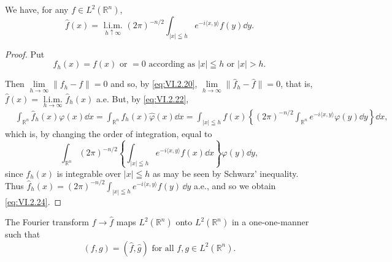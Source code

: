 \begin{corollary}\label{cor:VI.2.Corollary.1a} We have, for any $f \in L^2(\mathbb{R}^{n})$, 
\begin{equation}\label{eq:VI.2.24}
\hat {f} (x) = \underset {h \uparrow \infty} {\text{ l.i.m. }} (2 \pi) ^{-n/2} \int_{| x | \leqq h} e ^{- i \langle x, y \rangle} f (y) \dd y.
\end{equation}
\end{corollary}

\begin{proof}
 Put 
\[
f _{h} (x) = f (x) \text{ or } = 0 \text{ according as } | x | \leqq h \text{ or } | x | > h. \]

Then $\lim\limits_{h\to \infty}\|f_h - f\| = 0$ and so, by \eqref{eq:VI.2.20}, $\lim\limits_{h\to \infty}\|\hat{f}_h - \hat{f} \| = 0$, that is, $\hat{f}(x) = \underset {h\to \infty}{\text{ l.i.m. }}\hat{f}_h(x)$ a.e. But, by \eqref{eq:VI.2.22}, 
\[
\begin{aligned}
&\int_ {\mathbb{R}^{n}} \hat {f} _{h} (x) \varphi (x) \dd x  = \int_ {\mathbb{R}^{n}} f _{h} (x) \hat {\varphi} (x) \dd x = \int_{| x | \leqq h} f (x) \left\{(2 \pi) ^{-n/2} \int_ {\mathbb{R}^{n}} e ^{- i \langle x, y \rangle} \varphi (y) \dd y \right\} \dd x,
\end{aligned}
\]
which is, by changing the order of integration, equal to 
\[
\int_ {\mathbb{R}^{n}} (2 \pi) ^{-n/2} \left\{\int_{| x | \leqq h} e ^{- i \langle x, y \rangle} f (x) \dd x \right\} \varphi (y) \dd y,
\]
since $f_{h}(x)$ is integrable over $|x| \leqq h$ as may be seen by Schwarz' inequality. Thus $\hat{f}_{h}(x) = (2\pi)^{-n/2} \int_{|x| \leqq h} e^{-i\langle x, y \rangle} f(y) \, \dd y$ a.e., and so we obtain \eqref{eq:VI.2.24}. 
\end{proof}

\begin{corollary}\label{cor:VI.2.Corollary.2a} The Fourier transform $f \to \hat{f}$ maps $L^2(\mathbb{R}^{n})$ onto $L^2(\mathbb{R}^{n})$ in a one-one-manner such that 
\begin{equation}\label{eq:VI.2.25}
(f, g) = (\hat {f}, \hat {g}) \text{ for all } f, g \in L ^{2} (\mathbb{R}^{n}).
\end{equation}
\end{corollary}

